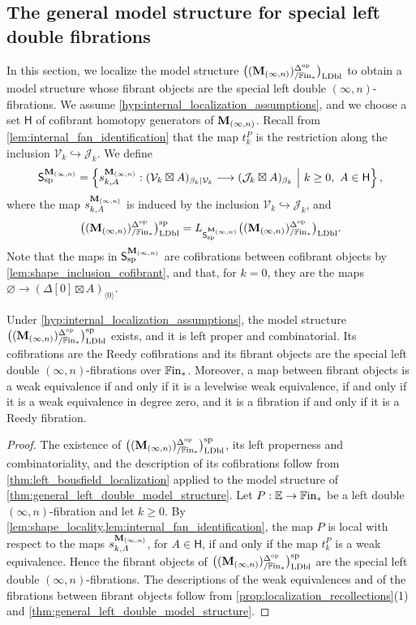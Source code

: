 \documentclass[10pt,reqno]{amsart}
\begin{document}
\subsection{The general model structure for special left double fibrations}
\label{subsec:general_internal_special_model_structure}

In this section, we localize the model structure $\bigl((\mathbf M_{(\infty,n)})^{\Delta^{\mathrm{op}}}_{/\mathbb{F}\mathrm{in}_*}\bigr)_{\mathrm{LDbl}}$ to
obtain a model structure whose fibrant objects are the special left
double $(\infty,n)$-fibrations. We assume
\cref{hyp:internal_localization_assumptions}, and we choose a set
$\mathsf H$ of cofibrant homotopy generators of $\mathbf M_{(\infty,n)}$. Recall
from \cref{lem:internal_fan_identification} that the map $t_k^P$ is
the restriction along the inclusion
$\mathcal V_k\hookrightarrow\mathcal J_k$. We define
\begin{equation}
\label{eq:general_internal_special_localizers}
\mathsf S_{\mathrm{sp}}^{\mathbf M_{(\infty,n)}}=
\left\{
 s^{\mathbf M_{(\infty,n)}}_{k,A}:
 (\mathcal V_k\boxtimes A)_{\beta_k|\mathcal V_k}
 \longrightarrow
 (\mathcal J_k\boxtimes A)_{\beta_k}
 \ \middle|\ k\geq0,\ A\in\mathsf H
\right\},
\end{equation}
where the map $s^{\mathbf M_{(\infty,n)}}_{k,A}$ is induced by the inclusion
$\mathcal V_k\hookrightarrow\mathcal J_k$, and
\[
\bigl((\mathbf M_{(\infty,n)})^{\Delta^{\mathrm{op}}}_{/\mathbb{F}\mathrm{in}_*}\bigr)_{\mathrm{LDbl}}^{\mathrm{sp}}=
L_{\mathsf S_{\mathrm{sp}}^{\mathbf M_{(\infty,n)}}}\bigl((\mathbf M_{(\infty,n)})^{\Delta^{\mathrm{op}}}_{/\mathbb{F}\mathrm{in}_*}\bigr)_{\mathrm{LDbl}}.
\]
Note that the maps in $\mathsf S_{\mathrm{sp}}^{\mathbf M_{(\infty,n)}}$ are
cofibrations between cofibrant objects by
\cref{lem:shape_inclusion_cofibrant}, and that, for $k=0$, they are
the maps
$\varnothing\to(\Delta[0]\boxtimes A)_{\langle0\rangle}$.

\begin{theorem}
\label{thm:general_internal_special_model_structure}
Under \cref{hyp:internal_localization_assumptions}, the model
structure $\bigl((\mathbf M_{(\infty,n)})^{\Delta^{\mathrm{op}}}_{/\mathbb{F}\mathrm{in}_*}\bigr)_{\mathrm{LDbl}}^{\mathrm{sp}}$ exists, and it is left proper and
combinatorial. Its cofibrations are the Reedy cofibrations and its
fibrant objects are the special left double $(\infty,n)$-fibrations
over $\mathbb{F}\mathrm{in}_*$. Moreover, a map between fibrant objects is a weak
equivalence if and only if it is a levelwise weak equivalence, if and
only if it is a weak equivalence in degree zero, and it is a fibration
if and only if it is a Reedy fibration.
\end{theorem}

\begin{proof}
The existence of $\bigl((\mathbf M_{(\infty,n)})^{\Delta^{\mathrm{op}}}_{/\mathbb{F}\mathrm{in}_*}\bigr)_{\mathrm{LDbl}}^{\mathrm{sp}}$, its left properness and
combinatoriality, and the description of its cofibrations follow from
\cref{thm:left_bousfield_localization} applied to the model structure
of \cref{thm:general_left_double_model_structure}. Let
$P:\mathbb E\to\mathbb{F}\mathrm{in}_*$ be a left double $(\infty,n)$-fibration
and let $k\geq0$. By
\cref{lem:shape_locality,lem:internal_fan_identification}, the map
$P$ is local with respect to the maps $s^{\mathbf M_{(\infty,n)}}_{k,A}$, for
$A\in\mathsf H$, if and only if the map $t_k^P$ is a weak
equivalence. Hence the fibrant objects of $\bigl((\mathbf M_{(\infty,n)})^{\Delta^{\mathrm{op}}}_{/\mathbb{F}\mathrm{in}_*}\bigr)_{\mathrm{LDbl}}^{\mathrm{sp}}$ are the
special left double $(\infty,n)$-fibrations. The descriptions of the
weak equivalences and of the fibrations between fibrant objects follow
from \cref{prop:localization_recollections}(1) and
\cref{thm:general_left_double_model_structure}.
\end{proof}
\end{document}

